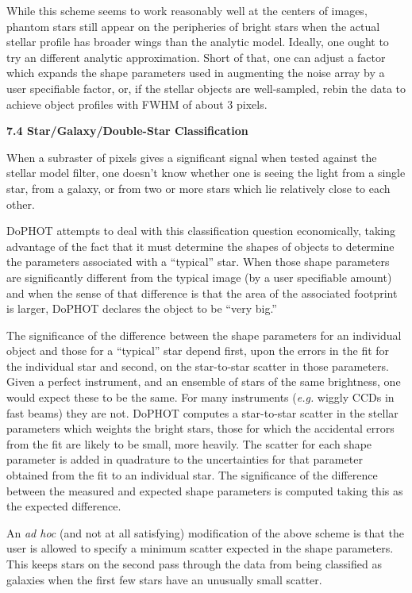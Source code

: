 While this scheme seems to work reasonably well at the
centers of images, phantom stars still appear on the
peripheries of bright stars when the actual stellar profile
has broader wings than the analytic model.  Ideally, one
ought to try an different analytic approximation.  Short of
that, one can adjust a factor which expands the shape
parameters used in augmenting the noise array by a user
specifiable factor, or, if the stellar objects are well-sampled, rebin
the data to achieve object profiles with FWHM of about 3 pixels.

\centerline{\bf 7.4 Star/Galaxy/Double-Star Classification}

When a subraster of pixels gives a significant signal when
tested against the stellar model filter, one doesn't know
whether one is seeing the light from a single star, from a
galaxy, or from two or more stars which lie relatively close
to each other.  

DoPHOT attempts to deal with this classification question
economically, taking advantage of the fact that it must
determine the shapes of objects to determine the parameters
associated with a ``typical'' star.  When those shape parameters
are significantly different from the typical image (by a
user specifiable amount) and when the sense of that
difference is that the area of the associated footprint is
larger, DoPHOT declares the object to be ``very big.''

The significance of the difference between the shape
parameters for an individual object and those for a
``typical'' star depend first, upon the errors in the fit
for the individual star and second, on the star-to-star
scatter in those parameters.  Given a perfect instrument,
and an ensemble of stars of the same brightness, one would
expect these to be the same.  For many instruments ({\it e.g.}
wiggly CCDs in fast beams) they are not.  DoPHOT computes a
star-to-star scatter in the stellar parameters which weights
the bright stars, those for which the accidental errors from
the fit are likely to be small, more heavily.  The scatter
for each shape parameter is added in quadrature to the
uncertainties for that parameter obtained from the fit to an
individual star.  The significance of the difference between
the measured and expected shape parameters is computed
taking this as the expected difference.

An {\it ad hoc} (and not at all satisfying) modification of the
above scheme is that the user is allowed to specify a
minimum scatter expected in the shape parameters.  This
keeps stars on the second pass through the data from being
classified as galaxies when the first few stars have an
unusually small scatter.

